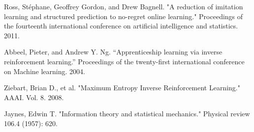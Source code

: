 \documentclass{article}
\begin{document}
\begin{thebibliography}{9}

Ross, Stéphane, Geoffrey Gordon, and Drew Bagnell. "A reduction of imitation learning and structured prediction to no-regret online learning." Proceedings of the fourteenth international conference on artificial intelligence and statistics. 2011.

Abbeel, Pieter, and Andrew Y. Ng. ``Apprenticeship learning via inverse reinforcement learning.'' Proceedings of the twenty-first international conference on Machine learning. 2004.

Ziebart, Brian D., et al. "Maximum Entropy Inverse Reinforcement Learning." AAAI. Vol. 8. 2008.

Jaynes, Edwin T. "Information theory and statistical mechanics." Physical review 106.4 (1957): 620.

\end{thebibliography}
\end{document}
